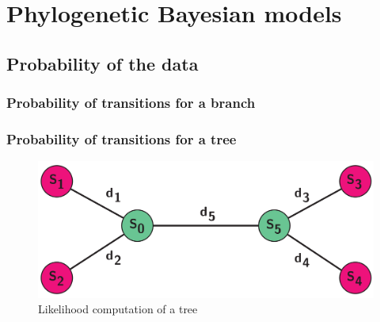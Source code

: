 \chapter{Phylogenetic Bayesian models}
\minitoc
\label{sec:phylo_bayes}

\section{Probability of the data}

\subsection{Probability of transitions for a branch}



\subsection{Probability of transitions for a tree}
\begin{figure}[thbp]
	\begin{center}
		\includegraphics[width=\textwidth] {figures/pruning}
	\end{center}
	\caption{Likelihood computation of a tree}
\end{figure}

